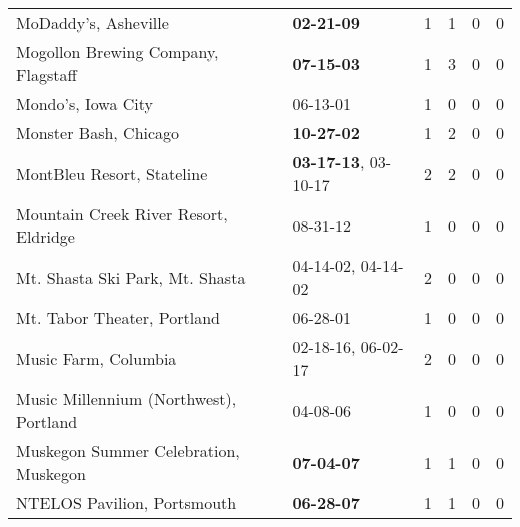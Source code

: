 \begin{longtable}{p{}p{}p{}p{}p{}p{}}
                                                         MoDaddy's, Asheville &                                       \textbf{02-21-09\textsuperscript{}} &  1 &  1 &  0 &  0 \\
                                          Mogollon Brewing Company, Flagstaff &                                       \textbf{07-15-03\textsuperscript{}} &  1 &  3 &  0 &  0 \\
                                                           Mondo's, Iowa City &                                                06-13-01\textsuperscript{} &  1 &  0 &  0 &  0 \\
                                                        Monster Bash, Chicago &                                       \textbf{10-27-02\textsuperscript{}} &  1 &  2 &  0 &  0 \\
                                                   MontBleu Resort, Stateline &           \textbf{03-17-13\textsuperscript{}}, 03-10-17\textsuperscript{} &  2 &  2 &  0 &  0 \\
                                        Mountain Creek River Resort, Eldridge &                                                08-31-12\textsuperscript{} &  1 &  0 &  0 &  0 \\
                                              Mt. Shasta Ski Park, Mt. Shasta &                    04-14-02\textsuperscript{}, 04-14-02\textsuperscript{} &  2 &  0 &  0 &  0 \\
                                                  Mt. Tabor Theater, Portland &                                                06-28-01\textsuperscript{} &  1 &  0 &  0 &  0 \\
                                                         Music Farm, Columbia &                    02-18-16\textsuperscript{}, 06-02-17\textsuperscript{} &  2 &  0 &  0 &  0 \\
                                       Music Millennium (Northwest), Portland &                                                04-08-06\textsuperscript{} &  1 &  0 &  0 &  0 \\
                                        Muskegon Summer Celebration, Muskegon &                                       \textbf{07-04-07\textsuperscript{}} &  1 &  1 &  0 &  0 \\
                                                  NTELOS Pavilion, Portsmouth &                                       \textbf{06-28-07\textsuperscript{}} &  1 &  1 &  0 &  0 \\

\end{longtable}
